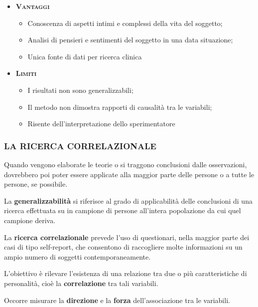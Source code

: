 \documentclass{subfiles}
\begin{document}
        \begin{itemize}
            \item \textbf{\textsc{Vantaggi}}
            \begin{itemize}
                \item Conoscenza di aspetti intimi e complessi della vita del soggetto;
                \item Analisi di pensieri e sentimenti del soggetto in una data situazione;
                \item Unica fonte di dati per ricerca clinica
            \end{itemize}
            \item \textbf{\textsc{Limiti}}
            \begin{itemize}
                \item I risultati non sono generalizzabili;
                \item Il metodo non dimostra rapporti di causalità tra le variabili;
                \item Risente dell'interpretazione dello sperimentatore
            \end{itemize}
        \end{itemize}
        \clearpage

    \subsubsection*{LA RICERCA CORRELAZIONALE}
        Quando vengono elaborate le teorie o si traggono conclusioni dalle osservazioni, dovrebbero 
        poi poter essere applicate alla maggior parte delle persone o a tutte le persone, se possibile. 

        La \textbf{generalizzabilità} si riferisce al grado di applicabilità delle conclusioni di 
        una ricerca effettuata su in campione di persone all'intera popolazione da cui quel campione deriva. 

        La \textbf{ricerca correlazionale} prevede l'uso di questionari, nella maggior parte dei 
        casi di tipo self-report, che consentono di raccogliere molte informazioni su un ampio 
        numero di soggetti contemporaneamente.

        L'obiettivo è rilevare l'esistenza di una relazione tra due o più caratteristiche di 
        personalità, cioè la \textbf{correlazione} tra tali variabili. 

        Occorre misurare la \textbf{direzione} e la \textbf{forza} dell'associazione tra le variabili. 
\end{document}
